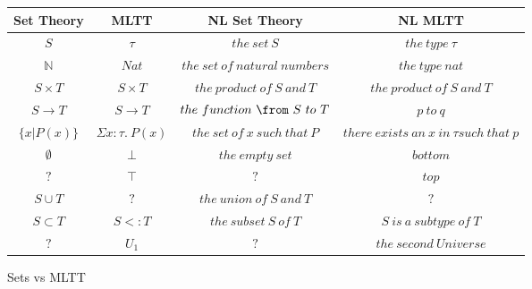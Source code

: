 \begin{figure}[H]
\centering
\begin{tabular}{|c|c|c|c|} \hline
 Set Theory & MLTT & NL Set Theory & NL MLTT \\ \hline
 $S$          & $\tau$                 & $the\ set\ S$                     & $the\ type\ \tau$ \\ 
 $\mathbb{N}$ & $Nat$                  & $the\ set\ of\ natural\ numbers$  & $the\ type\ nat$ \\
 $S \times T$ & $S \times T$           & $the\ product\ of\ S\ and\ T$     & $the\  product\  of\  S\  and\  T$ \\
 $S \to T$    & $S \to T$              & $the\ function\ \from\ S\ to\ T$  & $p\  to\  q$ \\
 $\{x|P(x)\}$ & $\Sigma x : \tau.\ P(x)$ & $the\ set\ of\ x\ such\ that\ P$  & $there\ exists\ an\ x\ in\ \tau such\ that\ p$ \\
 $\emptyset$  & $\bot$                 & $the\ empty\ set$                 & $bottom$ \\
 $?$          & $\top$                 & $?$                             & $top$ \\
 $S \cup T$   & $?$                    & $the\ union\ of\ S\ and\ T$       & $?$ \\
 $S \subset T$ & $S <: T$              & $the\ subset\ S\ of\ T$          & $S\ is\ a\ subtype\ of\ T$ \\
 $?$          & $U_1$                  & $?$ & $the\ second\ Universe$        \\ \hline 
\end{tabular}
\caption{Sets vs MLTT} \label{fig:M6}
\end{figure}



